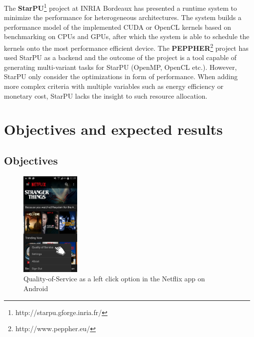 \documentclass{article}
\begin{document}
The \textbf{StarPU}\footnote{http://starpu.gforge.inria.fr/} project at INRIA Bordeaux has presented a runtime system to minimize the performance for heterogeneous architectures. 
The system builds a performance model of the implemented CUDA or OpenCL kernels based on benchmarking on CPUs and GPUs, after which the system is able to schedule the kernels onto the most performance efficient device. 
The \textbf{PEPPHER}\footnote{http://www.peppher.eu/} project has used StarPU as a backend and the outcome of the project is a tool capable of generating multi-variant tasks for StarPU (OpenMP, OpenCL etc.). 
However, StarPU only consider the optimizations in form of performance. 
When adding more complex criteria with multiple variables such as energy efficiency or monetary cost, StarPU lacks the insight to such resource allocation.

\section{Objectives and expected results}

\subsection{Objectives}
\begin{figure}
  \begin{center}
  \vspace{-0.8cm}
    \includegraphics[width=0.26\textwidth]{fig/netflix.png}
  \end{center}
  \caption{Quality-of-Service as a left click option in the Netflix app on Android}
  \label{fig:netflix}
  \vspace{-2.5cm}
\end{figure}
\end{document}
